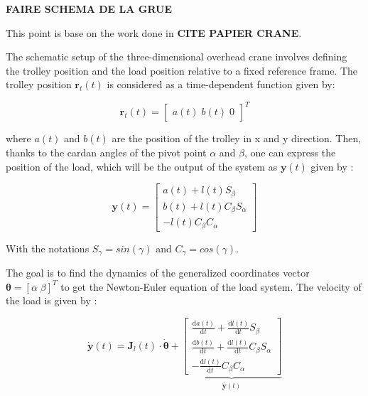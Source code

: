 \textbf{FAIRE SCHEMA DE LA GRUE}

This point is base on the work done in \textbf{CITE PAPIER CRANE}. 

The schematic setup of the three-dimensional overhead crane involves defining the trolley position and the load position relative to a fixed reference frame. The trolley position \(\boldsymbol{r}_{t}(t)\) is considered as a time-dependent function given by:

\begin{equation}
    \textbf{r}_t(t) = \begin{bmatrix}
        a(t) \; b(t) \; 0
    \end{bmatrix}^T
\end{equation}

where \(a(t)\) and \(b(t)\) are the position of the trolley in x and y direction. Then, thanks to the cardan angles of the pivot point \(\alpha\) and \(\beta\), one can express the position of the load, which will be the output of the system as \(\textbf{y}(t)\) given by :

\begin{equation}
    \textbf{y}(t) = \begin{bmatrix}
        a(t) + l(t)S_\beta \\
    b(t) + l(t)C_\beta S_\alpha \\
    -l(t)C_\beta C_\alpha
    \end{bmatrix}
\end{equation}

With the notations \(S_\gamma = sin(\gamma)\) and \(C_\gamma = cos(\gamma)\).

The goal is to find the dynamics of the generalized coordinates vector \(\boldsymbol{\theta} = \left[ \alpha \; \beta \right]^T\) to get the Newton-Euler equation of the load system. The velocity of the load is given by : 

\begin{equation}
    \dot{\mathbf{y}}(t) = \boldsymbol{J}_{l}(t) \cdot \dot{\boldsymbol{\theta}} + \underbrace{  \begin{bmatrix}
       \frac{\mathrm{d}a(t)}{\mathrm{d}t} + \frac{\mathrm{d}l(t)}{\mathrm{d}t} S_\beta \\
       \frac{\mathrm{d}b(t)}{\mathrm{d}t} + \frac{\mathrm{d}l(t)}{\mathrm{d}t} C_\beta S_\alpha \\
       -\frac{\mathrm{d}l(t)}{\mathrm{d}t} C_\beta C_\alpha
  \end{bmatrix}}_{\bar{\dot{\boldsymbol{y}}}(t)}
\end{equation}

